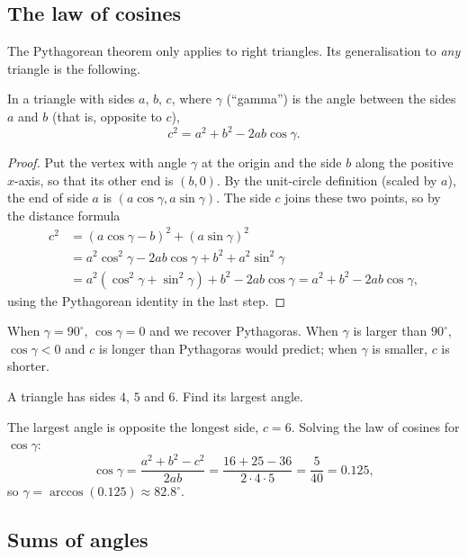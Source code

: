 \subsection{The law of cosines}

The Pythagorean theorem only applies to right triangles. Its generalisation to
\emph{any} triangle is the following.

\begin{theorem}\label{thm:law-of-cosines}
In a triangle with sides $a$, $b$, $c$, where $\gamma$ (``gamma'') is the
angle between the sides $a$ and $b$ (that is, opposite to $c$),
\[
  c^2 = a^2 + b^2 - 2ab\cos\gamma .
\]
\end{theorem}

\begin{proof}
Put the vertex with angle $\gamma$ at the origin and the side $b$ along the
positive $x$-axis, so that its other end is $(b, 0)$. By the unit-circle
definition (scaled by $a$), the end of side $a$ is $(a\cos\gamma,
a\sin\gamma)$. The side $c$ joins these two points, so by the distance
formula
\begin{align*}
  c^2 &= (a\cos\gamma - b)^2 + (a\sin\gamma)^2\\
      &= a^2\cos^2\gamma - 2ab\cos\gamma + b^2 + a^2\sin^2\gamma\\
      &= a^2(\cos^2\gamma + \sin^2\gamma) + b^2 - 2ab\cos\gamma
       = a^2 + b^2 - 2ab\cos\gamma ,
\end{align*}
using the Pythagorean identity in the last step.
\end{proof}

When $\gamma = 90^\circ$, $\cos\gamma = 0$ and we recover Pythagoras. When
$\gamma$ is larger than $90^\circ$, $\cos\gamma < 0$ and $c$ is longer than
Pythagoras would predict; when $\gamma$ is smaller, $c$ is shorter.

\begin{example}
A triangle has sides $4$, $5$ and $6$. Find its largest angle.

\sol The largest angle is opposite the longest side, $c = 6$. Solving the law
of cosines for $\cos\gamma$:
\[
  \cos\gamma = \frac{a^2 + b^2 - c^2}{2ab} = \frac{16 + 25 - 36}{2\cdot4\cdot5}
  = \frac{5}{40} = 0.125,
\]
so $\gamma = \arccos(0.125) \approx 82.8^\circ$.
\end{example}

\subsection{Sums of angles}


